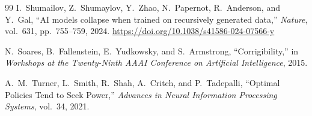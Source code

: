 \documentclass[11pt]{article}
\begin{document}
\begin{thebibliography}{99}
I.~Shumailov, Z.~Shumaylov, Y.~Zhao, N.~Papernot, R.~Anderson, and Y.~Gal,
``AI models collapse when trained on recursively generated data,''
\emph{Nature}, vol.~631, pp.~755--759, 2024.
\url{https://doi.org/10.1038/s41586-024-07566-y}

N.~Soares, B.~Fallenstein, E.~Yudkowsky, and S.~Armstrong,
``Corrigibility,''
in \emph{Workshops at the Twenty-Ninth AAAI Conference on Artificial Intelligence}, 2015.

A.~M.~Turner, L.~Smith, R.~Shah, A.~Critch, and P.~Tadepalli,
``Optimal Policies Tend to Seek Power,''
\emph{Advances in Neural Information Processing Systems}, vol.~34, 2021.

\end{thebibliography}
\endgroup
\end{document}
